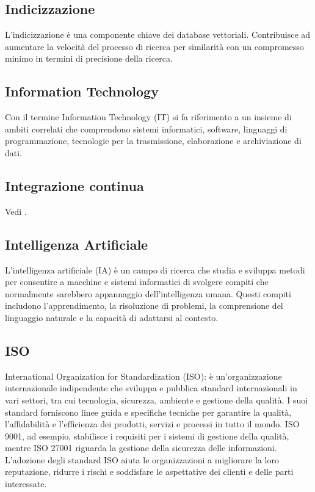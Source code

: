 \vspace{2em}
\subsection*{Indicizzazione}
\par L'indicizzazione è una componente chiave dei database vettoriali. Contribuisce ad aumentare la velocità del processo di ricerca per similarità con un compromesso minimo in termini di precisione della ricerca.

\vspace{2em}
\subsection*{Information Technology}
\par Con il termine Information Technology (IT) si fa riferimento a un insieme di ambiti correlati che comprendono sistemi informatici, software, linguaggi di programmazione, tecnologie per la trasmissione, elaborazione e archiviazione di dati.

\vspace{2em}
\subsection*{Integrazione continua}
\par Vedi .

\vspace{2em}
\subsection*{Intelligenza Artificiale}
\par L'intelligenza artificiale (IA) è un campo di ricerca che studia e sviluppa metodi per consentire a macchine e sistemi informatici di svolgere compiti che normalmente sarebbero appannaggio dell'intelligenza umana. Questi compiti includono l'apprendimento, la risoluzione di problemi, la comprensione del linguaggio naturale e la capacità di adattarsi al contesto.

\vspace{2em}
\subsection*{ISO}
\par International Organization for Standardization (ISO): è un'organizzazione internazionale indipendente che sviluppa e pubblica standard internazionali in vari settori, tra cui tecnologia, sicurezza, ambiente e gestione della qualità. I suoi standard forniscono linee guida e specifiche tecniche per garantire la qualità, l'affidabilità e l'efficienza dei prodotti, servizi e processi in tutto il mondo. ISO 9001, ad esempio, stabilisce i requisiti per i sistemi di gestione della qualità, mentre ISO 27001 riguarda la gestione della sicurezza delle informazioni. L'adozione degli standard ISO aiuta le organizzazioni a migliorare la loro reputazione, ridurre i rischi e soddisfare le aspettative dei clienti e delle parti interessate.

